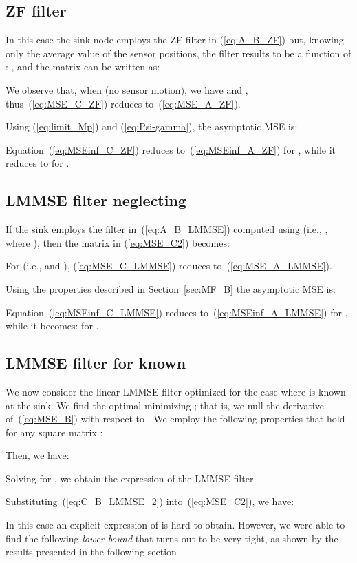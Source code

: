 \documentclass[final, a4paper]{IEEEtran}
\begin{document}
\subsection{ZF filter}

In this case the sink node employs the ZF filter in (\ref{eq:A_B_ZF}) but,
knowing only the average value of the sensor positions, the filter
results to be a function of : ,
and the matrix  can be written as:

We observe that, when  (no sensor motion), we have  and
, thus~(\ref{eq:MSE_C_ZF}) reduces to~(\ref{eq:MSE_A_ZF}).

Using (\ref{eq:limit_Mp}) and (\ref{eq:Psi-gamma}),  the asymptotic MSE is:

Equation~(\ref{eq:MSEinf_C_ZF}) reduces to~(\ref{eq:MSEinf_A_ZF}) for ,
while it reduces to  for .


\subsection{LMMSE filter neglecting   \label{subsec:neglecting-sigma_d}}

If the sink employs the filter in~(\ref{eq:A_B_LMMSE}) computed
using  (i.e., , where ), then the matrix 
in (\ref{eq:MSE_C2}) becomes:

For  (i.e.,  and ),
(\ref{eq:MSE_C_LMMSE}) reduces to~(\ref{eq:MSE_A_LMMSE}).

Using the properties described in Section~\ref{sec:MF_B} the asymptotic MSE is:

Equation~(\ref{eq:MSEinf_C_LMMSE}) reduces to~(\ref{eq:MSEinf_A_LMMSE}) for ,
while it becomes:   for .

\subsection{LMMSE filter for known  \label{subsec:known-sigma_d}}
We now consider the linear LMMSE filter optimized for the case where  is
known at the sink. We find the optimal 
minimizing ; that is, we null the derivative
of~(\ref{eq:MSE_B}) with respect to . We employ the following properties that hold
for any square matrix  \cite{MatrixBook}:

Then, we have:

Solving for , we obtain the expression of the LMMSE filter

Substituting~(\ref{eq:C_B_LMMSE_2}) into~(\ref{eq:MSE_C2}), we have:

In this case an explicit expression of  is hard to obtain.
However, we were able to find the following {\em lower bound} that
turns out to be very tight, as shown by the results presented in
the following section
\end{document}
